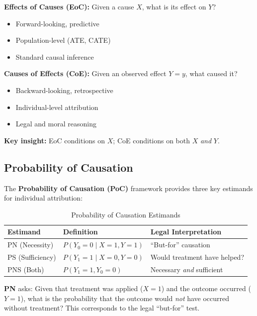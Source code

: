 \begin{tcolorbox}[colback=red!5!white, colframe=red!75!black,
    title=Effects of Causes vs. Causes of Effects]

\textbf{Effects of Causes (EoC):}
Given a cause $X$, what is its effect on $Y$?
\begin{itemize}[nosep]
\item Forward-looking, predictive
\item Population-level (ATE, CATE)
\item Standard causal inference
\end{itemize}

\textbf{Causes of Effects (CoE):}
Given an observed effect $Y=y$, what caused it?
\begin{itemize}[nosep]
\item Backward-looking, retrospective
\item Individual-level attribution
\item Legal and moral reasoning
\end{itemize}

\textbf{Key insight:} EoC conditions on $X$; CoE conditions on both $X$ \emph{and} $Y$.
\end{tcolorbox}

\subsection{Probability of Causation}

The \textbf{Probability of Causation (PoC)} framework \citep{PAP-tian2000probabilities}
provides three key estimands for individual attribution:

\begin{table}[h]
\centering
\caption{Probability of Causation Estimands}
\label{tab:poc}
\begin{tabular}{lll}
\toprule
\textbf{Estimand} & \textbf{Definition} & \textbf{Legal Interpretation} \\
\midrule
PN (Necessity) & $P(Y_0 = 0 \mid X = 1, Y = 1)$ & ``But-for'' causation \\
PS (Sufficiency) & $P(Y_1 = 1 \mid X = 0, Y = 0)$ & Would treatment have helped? \\
PNS (Both) & $P(Y_1 = 1, Y_0 = 0)$ & Necessary \emph{and} sufficient \\
\bottomrule
\end{tabular}
\end{table}

\textbf{PN} asks: Given that treatment was applied ($X=1$) and the outcome occurred ($Y=1$),
what is the probability that the outcome would \emph{not} have occurred without treatment?
This corresponds to the legal ``but-for'' test.

